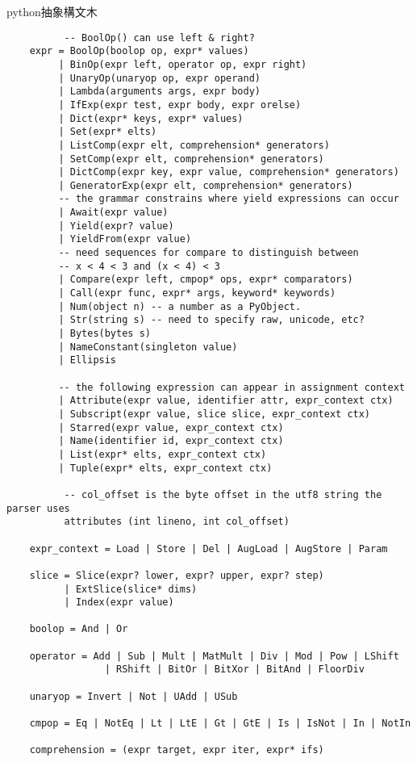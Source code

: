 \begin{itembox}[l]{python抽象構文木}
\begin{verbatim}
          -- BoolOp() can use left & right?
    expr = BoolOp(boolop op, expr* values)
         | BinOp(expr left, operator op, expr right)
         | UnaryOp(unaryop op, expr operand)
         | Lambda(arguments args, expr body)
         | IfExp(expr test, expr body, expr orelse)
         | Dict(expr* keys, expr* values)
         | Set(expr* elts)
         | ListComp(expr elt, comprehension* generators)
         | SetComp(expr elt, comprehension* generators)
         | DictComp(expr key, expr value, comprehension* generators)
         | GeneratorExp(expr elt, comprehension* generators)
         -- the grammar constrains where yield expressions can occur
         | Await(expr value)
         | Yield(expr? value)
         | YieldFrom(expr value)
         -- need sequences for compare to distinguish between
         -- x < 4 < 3 and (x < 4) < 3
         | Compare(expr left, cmpop* ops, expr* comparators)
         | Call(expr func, expr* args, keyword* keywords)
         | Num(object n) -- a number as a PyObject.
         | Str(string s) -- need to specify raw, unicode, etc?
         | Bytes(bytes s)
         | NameConstant(singleton value)
         | Ellipsis

         -- the following expression can appear in assignment context
         | Attribute(expr value, identifier attr, expr_context ctx)
         | Subscript(expr value, slice slice, expr_context ctx)
         | Starred(expr value, expr_context ctx)
         | Name(identifier id, expr_context ctx)
         | List(expr* elts, expr_context ctx)
         | Tuple(expr* elts, expr_context ctx)

          -- col_offset is the byte offset in the utf8 string the parser uses
          attributes (int lineno, int col_offset)

    expr_context = Load | Store | Del | AugLoad | AugStore | Param

    slice = Slice(expr? lower, expr? upper, expr? step)
          | ExtSlice(slice* dims)
          | Index(expr value)

    boolop = And | Or

    operator = Add | Sub | Mult | MatMult | Div | Mod | Pow | LShift
                 | RShift | BitOr | BitXor | BitAnd | FloorDiv

    unaryop = Invert | Not | UAdd | USub

    cmpop = Eq | NotEq | Lt | LtE | Gt | GtE | Is | IsNot | In | NotIn

    comprehension = (expr target, expr iter, expr* ifs)


\end{verbatim}
\end{itembox}
